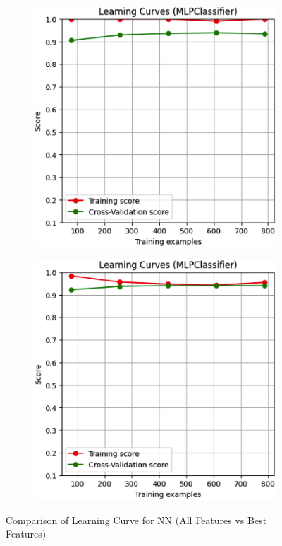 \documentclass[conference]{IEEEtran}
\begin{document}
\begin{figure}[H]
    \centering
    \begin{subfigure}[b]{0.45\linewidth}
        \centering
        \includegraphics[width=\linewidth]{images/LearningCurveNNAllFeatures.png}
        \label{fig:learning-curve-all}
    \end{subfigure}
    \hfill
    \begin{subfigure}[b]{0.45\linewidth}
        \centering
        \includegraphics[width=\linewidth]{images/LearningCurveNNBestFeatures.png}
        \label{fig:learning-curve-best}
    \end{subfigure}
    \caption{Comparison of Learning Curve for NN (All Features vs Best Features)}
    \label{fig:learning-curve-comparison}
\end{figure}
\end{document}
